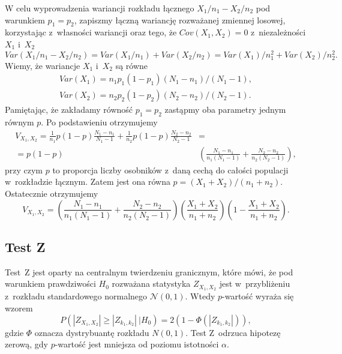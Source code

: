 W celu wyprowadzenia wariancji rozkładu łącznego $X_1/n_1-X_2/n_2$ pod warunkiem $p_1=p_2$, zapiszmy łączną wariancję rozważanej zmiennej losowej, korzystając z~własności wariancji oraz tego, że $Cov(X_1,X_2)=0$ z~niezależności $X_1$ i~$X_2$
\begin{equation}
Var(X_1/n_1-X_2/n_2)=Var(X_1/n_1) + Var(X_2/n_2) = Var(X_1)/n_1^2+Var(X_2)/n_2^2.
\end{equation}
Wiemy, że wariancje $X_1$ i~$X_2$ są równe
\begin{align}
Var(X_1)=n_1 p_1 (1-p_1)(N_1-n_1)/(N_1-1),\\
Var(X_2)=n_2 p_2 (1-p_2)(N_2-n_2)/(N_2-1).
\end{align}
Pamiętając, że zakładamy równość $p_1=p_2$ zastąpmy oba parametry jednym równym $p$. Po podstawieniu otrzymujemy
\begin{equation}
\begin{split}
V_{X_1,X_2} = \frac{1}{n_1}p(1-p)\frac{N_1-n_1}{N_1-1} + \frac{1}{n_2}p(1-p)\frac{N_2-n_2}{N_2-1}&= \\
=p(1-p)&\left(\frac{N_1-n_1}{n_1(N_1-1)}+\frac{N_2-n_2}{n_2(N_2-1)}\right),
\end{split}
\end{equation}
przy czym $p$ to proporcja liczby osobników z~daną cechą do całości populacji w~rozkładzie łącznym.  Zatem jest ona równa $p=(X_1+X_2)/(n_1+n_2)$. Ostatecznie otrzymujemy
\begin{equation}
V_{X_1,X_2} = \left(\frac{N_1-n_1}{n_1(N_1-1)}+\frac{N_2-n_2}{n_2(N_2-1)}\right)\left(\frac{X_1+X_2}{n_1+n_2}\right)\left(1-\frac{X_1+X_2}{n_1+n_2}\right).
\end{equation}

\subsection{Test Z}
Test~Z jest oparty na centralnym twierdzeniu granicznym, które mówi, że pod warunkiem prawdziwości $H_0$ rozważana statystyka $Z_{X_1,X_2}$ jest w~przybliżeniu z~rozkładu standardowego normalnego $\mathcal{N}(0,1)$. Wtedy $p$-wartość wyraża się wzorem
\begin{equation}
P(|Z_{X_1,X_2}|\geq|Z_{k_1,k_2}|\ |H_0) = 2(1-\Phi(|Z_{k_1,k_2}|)),
\end{equation}
gdzie $\Phi$ oznacza dystrybuantę rozkładu $N(0,1)$. Test Z~odrzuca hipotezę zerową, gdy $p$-wartość jest mniejsza od poziomu istotności $\alpha$.

